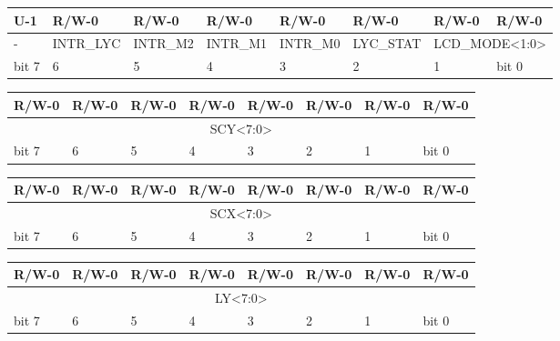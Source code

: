 \documentclass[a4paper, draft, oneside]{memoir}
\newcommand{\hex}[1]{\texttt{0x#1}}
\begin{document}
\begin{register}[H]
  \caption{\hex{FF41} - LCDC - PPU status register}
  {
    \ttfamily
    \begin{tabularx}{\textwidth}{|X|X|X|X|X|X|X|X|}
      \hline
      U-1                     & R/W-0     & R/W-0    & R/W-0    & R/W-0    & R/W-0     & R/W-0                                & R/W-0 \\
      \hline
      \cellcolor{LightGray} - & INTR\_LYC & INTR\_M2 & INTR\_M1 & INTR\_M0 & LYC\_STAT & \multicolumn{2}{c|}{LCD\_MODE<1:0>} \\
      \hline
      bit 7                   & 6         & 5        & 4        & 3        & 2         & 1                                    & bit 0 \\
      \hline
    \end{tabularx}
  }
\end{register}

\begin{register}[H]
  \caption{\hex{FF42} - SCY - Vertical scroll register}
  {
    \ttfamily
    \begin{tabularx}{\textwidth}{|X|X|X|X|X|X|X|X|}
      \hline
      R/W-0                           & R/W-0 & R/W-0 & R/W-0 & R/W-0 & R/W-0 & R/W-0 & R/W-0 \\
      \hline
      \multicolumn{8}{|c|}{SCY<7:0>} \\
      \hline
      bit 7                           & 6     & 5     & 4     & 3     & 2     & 1     & bit 0 \\
      \hline
    \end{tabularx}
  }
\end{register}

\begin{register}[H]
  \caption{\hex{FF43} - SCX - Horizontal scroll register}
  {
    \ttfamily
    \begin{tabularx}{\textwidth}{|X|X|X|X|X|X|X|X|}
      \hline
      R/W-0                           & R/W-0 & R/W-0 & R/W-0 & R/W-0 & R/W-0 & R/W-0 & R/W-0 \\
      \hline
      \multicolumn{8}{|c|}{SCX<7:0>} \\
      \hline
      bit 7                           & 6     & 5     & 4     & 3     & 2     & 1     & bit 0 \\
      \hline
    \end{tabularx}
  }
\end{register}

\begin{register}[H]
  \caption{\hex{FF43} - LY - Scanline register}
  {
    \ttfamily
    \begin{tabularx}{\textwidth}{|X|X|X|X|X|X|X|X|}
      \hline
      R/W-0                          & R/W-0 & R/W-0 & R/W-0 & R/W-0 & R/W-0 & R/W-0 & R/W-0 \\
      \hline
      \multicolumn{8}{|c|}{LY<7:0>} \\
      \hline
      bit 7                          & 6     & 5     & 4     & 3     & 2     & 1     & bit 0 \\
      \hline
    \end{tabularx}
  }
\end{register}
\end{document}

